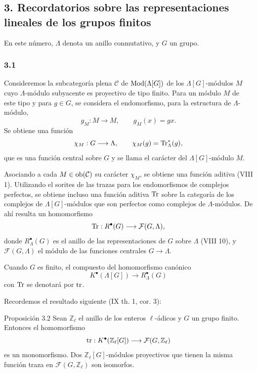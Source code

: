 \subsection*{3. Recordatorios sobre las representaciones lineales de los grupos finitos}

En este número, $\Lambda$ denota un anillo conmutativo, y $G$ un grupo.

\subsubsection*{3.1}

Consideremos la subcategoría plena $\mathcal C$ de $\operatorname{Mod}(\Lambda[G])$ de los $\Lambda[G]$-módulos $M$ cuyo $\Lambda$-módulo subyacente es proyectivo de tipo finito. Para un módulo $M$ de este tipo y para $g\in G$, se considera el endomorfismo, para la estructura de $\Lambda$-módulo,
\[
g_M:M\longrightarrow M,
\qquad g_M(x)=gx.
\]
Se obtiene una función
\[
\chi_M:G\longrightarrow \Lambda,
\qquad \chi_M(g)=\operatorname{Tr}^*_\Lambda(g),
\]
que es una función central sobre $G$ y se llama el carácter del $\Lambda[G]$-módulo $M$.

Asociando a cada $M\in\operatorname{ob}(\mathcal C)$ su carácter $\chi_M$, se obtiene una función aditiva (VIII 1). Utilizando el sorites de las trazas para los endomorfismos de complejos perfectos, se obtiene incluso una función aditiva $\operatorname{Tr}$ sobre la categoría de los complejos de $\Lambda[G]$-módulos que son perfectos como complejos de $\Lambda$-módulos. De ahí resulta un homomorfismo
\[
\operatorname{Tr}:R^{\bullet}(G)\longrightarrow \mathcal F(G,\Lambda),
\]
donde $R^{\bullet}_{\Lambda}(G)$ es el anillo de las representaciones de $G$ sobre $\Lambda$ (VIII 10), y $\mathcal F(G,\Lambda)$ el módulo de las funciones centrales $G\to\Lambda$.

Cuando $G$ es finito, el compuesto del homomorfismo canónico
\[
K^{\bullet}(\Lambda[G])\longrightarrow R^{\bullet}_{\Lambda}(G)
\]
con $\operatorname{Tr}$ se denotará por $\operatorname{tr}$.

Recordemos el resultado siguiente (IX th. 1, cor. 3):

\begin{statement}{Proposición 3.2}
Sean $\mathbb Z_\ell$ el anillo de los enteros $\ell$-ádicos y $G$ un grupo finito. Entonces el homomorfismo
\[
\operatorname{tr}:K^{\bullet}(\mathbb Z_\ell[G])\longrightarrow \mathcal F(G,\mathbb Z_\ell)
\]
es un monomorfismo. Dos $\mathbb Z_\ell[G]$-módulos proyectivos que tienen la misma función traza en $\mathcal F(G,\mathbb Z_\ell)$ son isomorfos.
\end{statement}
